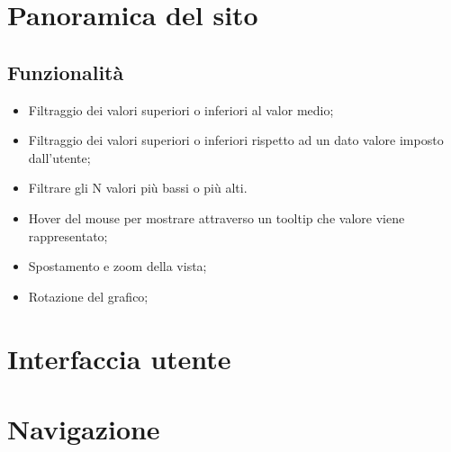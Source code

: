 \section{Panoramica del sito}

\subsection{Funzionalità}
\begin{itemize}
    \item Filtraggio dei valori superiori o inferiori al valor medio;
    \item Filtraggio dei valori superiori o inferiori rispetto ad un dato valore imposto dall'utente;
    \item Filtrare gli N valori più bassi o più alti.
\end{itemize}
\begin{itemize}
    \item Hover del mouse per mostrare attraverso un tooltip che valore viene rappresentato;
    \item Spostamento e zoom della vista;
    \item Rotazione del grafico;
\end{itemize}

\section{Interfaccia utente}

\section{Navigazione}


